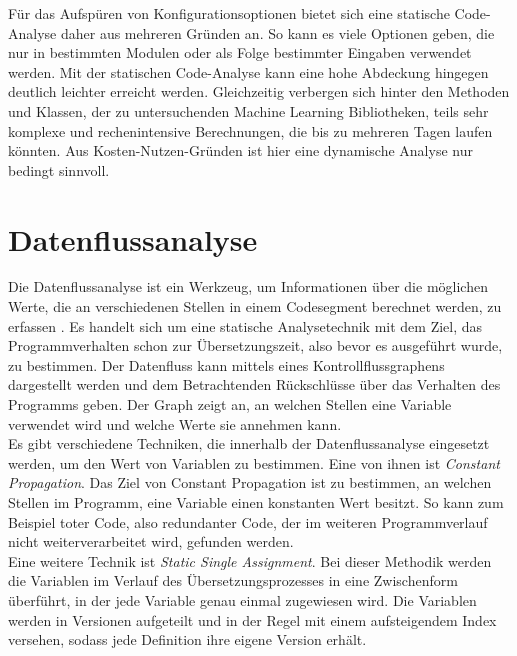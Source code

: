 \documentclass[german,bachelor]{swsLeipzig}
\begin{document}
Für das Aufspüren von Konfigurationsoptionen bietet sich eine statische Code-Analyse daher aus mehreren Gründen an.
So kann es viele Optionen geben, die nur in bestimmten Modulen oder als Folge bestimmter Eingaben verwendet werden.
Mit der statischen Code-Analyse kann eine hohe Abdeckung hingegen deutlich leichter erreicht werden.
Gleichzeitig verbergen sich hinter den Methoden und Klassen, der zu untersuchenden Machine Learning Bibliotheken,
teils sehr komplexe und rechenintensive Berechnungen, die bis zu mehreren Tagen laufen könnten.
Aus Kosten-Nutzen-Gründen ist hier eine dynamische Analyse nur bedingt sinnvoll.\\

\section{Datenflussanalyse}
Die Datenflussanalyse ist ein Werkzeug, um Informationen über die möglichen Werte, die an verschiedenen
Stellen in einem Codesegment berechnet werden, zu erfassen \cite[]{58766}.
Es handelt sich um eine statische Analysetechnik mit dem Ziel, das Programmverhalten schon zur Übersetzungszeit,
also bevor es ausgeführt wurde, zu bestimmen.
Der Datenfluss kann mittels eines Kontrollflussgraphens dargestellt werden und dem Betrachtenden
Rückschlüsse über das Verhalten des Programms geben.
Der Graph zeigt an, an welchen Stellen eine Variable verwendet wird und welche Werte sie annehmen kann.\\

Es gibt verschiedene Techniken, die innerhalb der Datenflussanalyse eingesetzt werden, um den Wert von Variablen zu bestimmen.
Eine von ihnen ist \textit{Constant Propagation}.
Das Ziel von Constant Propagation ist zu bestimmen, an welchen Stellen im Programm, eine Variable einen konstanten Wert besitzt.
So kann zum Beispiel toter Code, also redundanter Code, der im weiteren Programmverlauf nicht weiterverarbeitet wird, gefunden werden.\\

Eine weitere Technik ist \textit{Static Single Assignment}.
Bei dieser Methodik werden die Variablen im Verlauf des Übersetzungsprozesses in eine Zwischenform überführt, in der jede Variable
genau einmal zugewiesen wird.
Die Variablen werden in Versionen aufgeteilt und in der Regel mit einem aufsteigendem Index versehen,
sodass jede Definition ihre eigene Version erhält.\\
\end{document}
